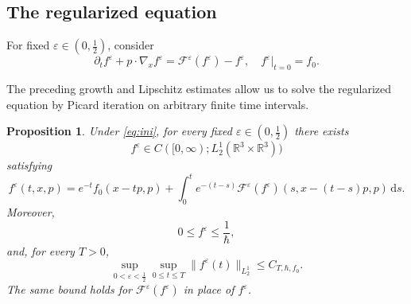 \documentclass[10pt,reqno]{amsart}
\numberwithin{equation}{section}
\newtheorem{proposition}{Proposition}[section]
\theoremstyle{definition}
\newcommand{\R}{\mathbb R}
\newcommand{\ds}{\mathrm{d}s}
\newcommand{\e}{\varepsilon}
\newcommand{\calF}{\mathcal F}
\newcommand{\bq}{\begin{equation}}
\newcommand{\eq}{\end{equation}}
\newcommand{\pa}{\partial}
\begin{document}
%
%
%
%
%
%

\subsection{The regularized equation}

For fixed $\e\in(0,\frac12)$, consider
\bq \label{eq:reg-PDE}
\pa_t f^\e+p\cdot\nabla_xf^\e  =\calF^\e(f^\e)-f^\e,  \quad  f^\e|_{t=0}=f_0.
\eq

The preceding growth and Lipschitz estimates allow us to solve the regularized equation by Picard iteration on arbitrary finite time intervals.


\begin{proposition}\label{prop:regul-exi}
Under \eqref{eq:ini}, for every fixed $\e\in(0,\frac12)$ there exists
\[
 f^\e\in C([0,\infty);L^1_2(\R^3 \times \R^3))
\]
satisfying
\bq \label{eq:reg-mild}
 f^\e(t,x,p)  =e^{-t}f_0(x-tp,p)  +\int_0^t e^{-(t-s)}  \calF^\e(f^\e)(s,x-(t-s)p,p)\,\ds.
\eq
Moreover,
\bq \label{eq:reg-pauli}
 0\leq f^\e\leq\frac1\hbar ,
\eq
and, for every $T>0$,
\bq \label{eq:unif-f-eps}
 \sup_{0<\e<\frac12}\sup_{0\leq t\leq T}  \|f^\e(t)\|_{L^1_2}\leq C_{T,\hbar,f_0}.
\eq
The same bound holds for $\calF^\e(f^\e)$ in place of $f^\e$.
\end{proposition}
\end{document}
